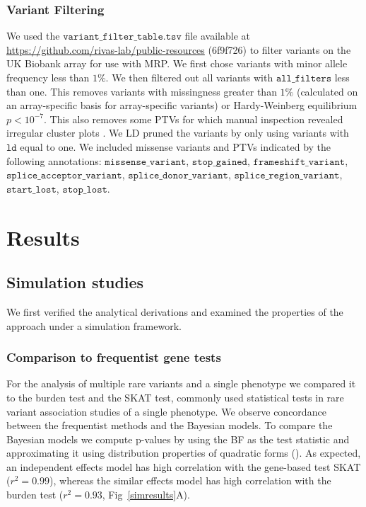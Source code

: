 \subsubsection*{Variant Filtering}
We used the $\texttt{variant\_filter\_table.tsv}$ file available at \url{https://github.com/rivas-lab/public-resources} (6f9f726) to filter variants on the UK Biobank array for use with MRP. We first chose variants with minor allele frequency less than $1\%$. We then filtered out all variants with $\texttt{all\_filters}$ less than one. This removes variants with missingness greater than $1\%$ (calculated on an array-specific basis for array-specific variants) or Hardy-Weinberg equilibrium $p < 10^{-7}$. This also removes some PTVs for which manual inspection revealed irregular cluster plots \cite{DeBoever179762}. We LD pruned the variants by only using variants with $\texttt{ld}$ equal to one. We included missense variants and PTVs indicated by the following annotations: $\texttt{missense\_variant}$, 
$\texttt{stop\_gained}$, $\texttt{frameshift\_variant}$, $\texttt{splice\_acceptor\_variant}$, $\texttt{splice\_donor\_variant}$, $\texttt{splice\_region\_variant}$, $\texttt{start\_lost}$, $\texttt{stop\_lost}$.

\section*{Results}

\subsection*{Simulation studies}
We first verified the analytical derivations and examined the properties of the approach under a simulation framework. 

\subsubsection*{Comparison to frequentist gene tests}
For the analysis of multiple rare variants and a single phenotype we compared it to the burden test and the SKAT test, commonly used statistical tests in rare variant association studies of a single phenotype. We observe concordance between the frequentist methods and the Bayesian models. To compare the Bayesian models we compute p-values by using the BF as the test statistic and approximating it using distribution properties of quadratic forms (). As expected, an independent effects model has high correlation with the gene-based test SKAT ($r^2 = 0.99$), whereas the similar effects model has high correlation with the burden test ($r^2 = 0.93$, Fig~\ref{simresults}A). 

